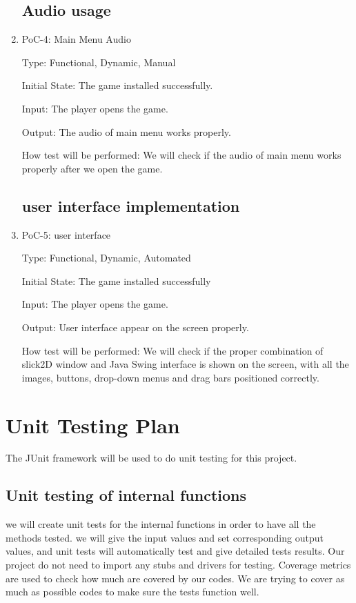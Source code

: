 \documentclass[12pt]{article}
\begin{document}
\begin{enumerate}
    




\subsection{Audio usage}

    \item{PoC-4: Main Menu Audio}
					
	Type: Functional, Dynamic, Manual
					
    Initial State: The game installed successfully.
					
	Input: The player opens the game.
					
	Output: The audio of main menu works properly.
					
	How test will be performed: We will check if the audio of main menu works properly after we open the game.
	
	





\subsection{user interface implementation}

      \item{PoC-5: user interface}
      
      Type: Functional, Dynamic, Automated
      
      Initial State: The game installed successfully
      
      Input: The player opens the game.
      
      Output: User interface appear on the screen properly.
      
      How test will be performed: We will check if the proper combination of slick2D window and Java Swing interface is shown on the screen, with all the images, buttons, drop-down menus and drag bars positioned correctly.
      

	\end{enumerate}
	
							
				
\section{Unit Testing Plan}
	The JUnit framework will be used to do unit testing for this project. 
		
	\subsection{Unit testing of internal functions}
	we will create unit tests for the internal functions in order to have all the methods tested. we will give the input values and set corresponding output values, and unit tests will automatically test and give detailed tests results. Our project do not need to import any stubs and drivers for testing. Coverage metrics are used to check how much are covered by our codes. We are trying to cover as much as possible codes to make sure the tests function well.
		
		
\end{document}
